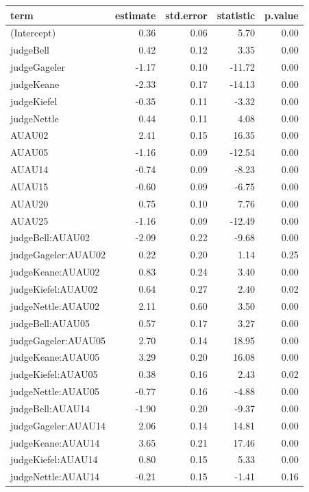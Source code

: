 \documentclass{monashthesis}
\begin{document}
\begin{tabular}{l|r|r|r|r}
\hline
term & estimate & std.error & statistic & p.value\\
\hline
(Intercept) & 0.36 & 0.06 & 5.70 & 0.00\\
\hline
judgeBell & 0.42 & 0.12 & 3.35 & 0.00\\
\hline
judgeGageler & -1.17 & 0.10 & -11.72 & 0.00\\
\hline
judgeKeane & -2.33 & 0.17 & -14.13 & 0.00\\
\hline
judgeKiefel & -0.35 & 0.11 & -3.32 & 0.00\\
\hline
judgeNettle & 0.44 & 0.11 & 4.08 & 0.00\\
\hline
AUAU02 & 2.41 & 0.15 & 16.35 & 0.00\\
\hline
AUAU05 & -1.16 & 0.09 & -12.54 & 0.00\\
\hline
AUAU14 & -0.74 & 0.09 & -8.23 & 0.00\\
\hline
AUAU15 & -0.60 & 0.09 & -6.75 & 0.00\\
\hline
AUAU20 & 0.75 & 0.10 & 7.76 & 0.00\\
\hline
AUAU25 & -1.16 & 0.09 & -12.49 & 0.00\\
\hline
judgeBell:AUAU02 & -2.09 & 0.22 & -9.68 & 0.00\\
\hline
judgeGageler:AUAU02 & 0.22 & 0.20 & 1.14 & 0.25\\
\hline
judgeKeane:AUAU02 & 0.83 & 0.24 & 3.40 & 0.00\\
\hline
judgeKiefel:AUAU02 & 0.64 & 0.27 & 2.40 & 0.02\\
\hline
judgeNettle:AUAU02 & 2.11 & 0.60 & 3.50 & 0.00\\
\hline
judgeBell:AUAU05 & 0.57 & 0.17 & 3.27 & 0.00\\
\hline
judgeGageler:AUAU05 & 2.70 & 0.14 & 18.95 & 0.00\\
\hline
judgeKeane:AUAU05 & 3.29 & 0.20 & 16.08 & 0.00\\
\hline
judgeKiefel:AUAU05 & 0.38 & 0.16 & 2.43 & 0.02\\
\hline
judgeNettle:AUAU05 & -0.77 & 0.16 & -4.88 & 0.00\\
\hline
judgeBell:AUAU14 & -1.90 & 0.20 & -9.37 & 0.00\\
\hline
judgeGageler:AUAU14 & 2.06 & 0.14 & 14.81 & 0.00\\
\hline
judgeKeane:AUAU14 & 3.65 & 0.21 & 17.46 & 0.00\\
\hline
judgeKiefel:AUAU14 & 0.80 & 0.15 & 5.33 & 0.00\\
\hline
judgeNettle:AUAU14 & -0.21 & 0.15 & -1.41 & 0.16\\

\end{tabular}
\end{document}
